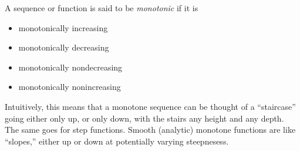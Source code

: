 \documentclass{article}
\begin{document}
A sequence or function is said to be \emph{monotonic} if it is 

\begin{itemize}
\item monotonically increasing
\item monotonically decreasing
\item monotonically nondecreasing
\item monotonically nonincreasing
\end{itemize}

Intuitively, this means that a monotone sequence can be thought of a ``staircase'' going either only up, or only down, with the stairs any height and any depth.  The same goes for step functions.  Smooth (analytic) monotone functions are like ``slopes,'' either up or down at potentially varying steepnesess.
\end{document}
